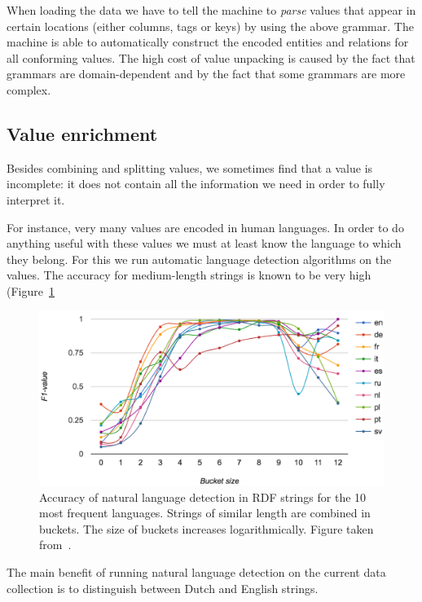 \documentclass[a4paper]{scrartcl}
\begin{document}
When loading the data we have to tell the machine to \emph{parse}
values that appear in certain locations (either columns, tags or keys)
by using the above grammar.  The machine is able to automatically
construct the encoded entities and relations for all conforming
values.  The high cost of value unpacking is caused by the fact that
grammars are domain-dependent and by the fact that some grammars are
more complex.


\subsection{Value enrichment}
\label{sec:value_enrichment}

Besides combining and splitting values, we sometimes find that a value
is incomplete: it does not contain all the information we need in
order to fully interpret it.

For instance, very many values are encoded in human languages.  In
order to do anything useful with these values we must at least know
the language to which they belong.  For this we run automatic language
detection algorithms on the values.  The accuracy for medium-length
strings is known to be very high (Figure~\ref{fig:natlang}

\begin{figure}
  \includegraphics[width=\linewidth]{img/natlang.png}
  \caption{Accuracy of natural language detection in RDF strings for
    the 10 most frequent languages.  Strings of similar length are
    combined in buckets.  The size of buckets increases
    logarithmically.  Figure taken from~\cite{Beek2016c}.}
  \label{fig:natlang}
\end{figure}

The main benefit of running natural language detection on the current
data collection is to distinguish between Dutch and English strings.
\end{document}
